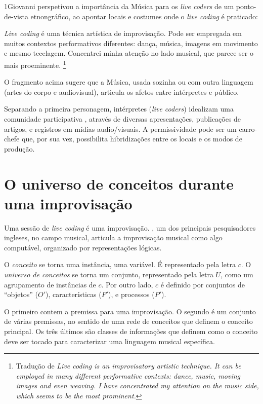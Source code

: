 1Giovanni  perspetivou a importância da Música para os \emph{live coders} de um ponto-de-vista etnongráfico, ao apontar locais e costumes onde o \emph{live coding} é praticado:

\begin{citacao}
\emph{Live coding} é uma técnica artística de improvisação. Pode ser empregada em muitos contextos performativos diferentes: dança, música, imagens em movimento e mesmo tecelagem. Concentrei minha atenção no lado musical, que parece ser o mais proeminente. \cite[p.~117]{mori_analysing_2015}\footnote{Tradução de \emph{Live coding is an improvisatory artistic technique. It can be employed in many different performative contexts: dance, music, moving images and even weaving. I have concentrated my attention on the music side, which seems to be the most prominent.}}
\end{citacao}

O fragmento acima sugere que a Música, usada sozinha ou com outra linguagem (artes do corpo e audiovisual), articula os afetos entre intérpretes e público.

Separando a primeira personagem,  intérpretes (\emph{live coders}) idealizam uma comunidade participativa \cite[p.~71]{prospero_social_2015}, através de diversas apresentações, publicações de artigos, e registros em mídias audio/visuais. A permissividade pode ser um carro-chefe que, por sua vez, possibilita  hibridizações entre os locais e os modos de produção.

\section{O universo de conceitos durante uma improvisação}\label{sec:universo}

Uma sessão de \emph{live coding} é uma improvisação. , um dos principais pesquisadores ingleses, no campo musical, articula a improvisação musical como algo computável, organizado por representações lógicas. 

O \emph{conceito} se torna uma instância, uma variável. É representado pela letra $c$. O  \emph{universo de conceitos} se torna um conjunto, representado pela letra $U$, como um agrupamento de instâncias de $c$. Por outro lado, $c$ é definido por conjuntos de ``objetos'' ($O'$), características ($F'$), e processos ($P'$). 

O primeiro contem a premissa para uma improvisação. O segundo é um conjunto de várias premissas, no sentido de uma rede de conceitos que definem o conceito principal. Os três últimos são classes de informações que definem como o conceito deve ser tocado para caracterizar uma linguagem musical específica.

